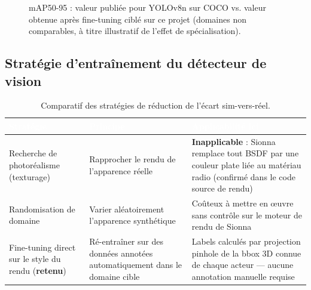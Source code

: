 \documentclass[12pt,a4paper,titlepage]{article}
\newcommand{\hd}[1]{\textcolor{white}{\textbf{#1}}}
\newcommand{\choix}{\rowcolor{tabchoice}}
\begin{document}
\begin{figure}[H]
    \centering
    \caption{mAP50-95 : valeur publiée pour YOLOv8n sur COCO vs. valeur obtenue après fine-tuning ciblé sur ce projet (domaines non comparables, à titre illustratif de l'effet de spécialisation).}
    \label{fig:chart_map}
\end{figure}

\subsection{Stratégie d'entraînement du détecteur de vision}
\label{subsec:choix_vision_strategie}

\begin{table}[H]
    \centering
    \caption{Comparatif des stratégies de réduction de l'écart sim-vers-réel.}
    \begin{tabularx}{\textwidth}{F{3.6cm}LL}
        \toprule
        \hd{Stratégie} & \hd{Principe} & \hd{Applicabilité ici} \\
        \midrule
        Recherche de photoréalisme (texturage) & Rapprocher le rendu de l'apparence réelle & \textbf{Inapplicable} : Sionna remplace tout BSDF par une couleur plate liée au matériau radio (confirmé dans le code source de rendu) \\
        Randomisation de domaine & Varier aléatoirement l'apparence synthétique & Coûteux à mettre en \oe uvre sans contrôle sur le moteur de rendu de Sionna \\
        \choix Fine-tuning direct sur le style du rendu (\textbf{retenu}) & Ré-entraîner sur des données annotées automatiquement dans le domaine cible & Labels calculés par projection pinhole de la bbox 3D connue de chaque acteur --- aucune annotation manuelle requise \\
        \bottomrule
    \end{tabularx}
\end{table}
\end{document}
